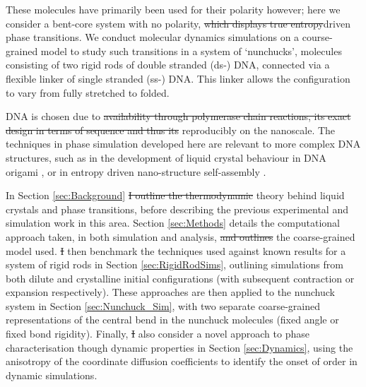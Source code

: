 \documentclass[11pt, a4paper]{article} %
\providecommand{\DIFadd}[1]{{\protect\color{blue}\uwave{#1}}} %
\providecommand{\DIFdel}[1]{{\protect\color{red}\sout{#1}}}                      %
\providecommand{\DIFaddbegin}{} %
\providecommand{\DIFaddend}{} %
\providecommand{\DIFdelbegin}{} %
\providecommand{\DIFdelend}{} %
\begin{document}
These molecules have primarily been used for their polarity however; here we consider a bent-core system with no polarity, \DIFdelbegin \DIFdel{which displays true entropy\textendash }\DIFdelend \DIFaddbegin \DIFadd{\textcolor{forestgreen}{which displays true} entropically }\DIFaddend driven phase transitions. We conduct molecular dynamics simulations on a course-grained model to study such transitions in a system of ‘nunchucks’, molecules consisting of two rigid rods of double stranded (ds-) DNA, connected via a flexible linker of single stranded (ss-) DNA. This linker allows the configuration to vary from fully stretched to folded. 

DNA is chosen due to \DIFdelbegin \DIFdel{availability through polymerase chain reactions, its exact design in terms of sequence and thus its }\DIFdelend \DIFaddbegin \DIFadd{its \textcolor{forestgreen}{availablity through PCR, its exact design in terms of sequence and thus its} }\DIFaddend reproducibly on the nanoscale. The techniques in phase simulation developed here are relevant to more complex DNA structures, such as in the development of liquid crystal behaviour in DNA origami \cite{Cha2015,Wang2018}, or in entropy driven nano-structure self-assembly \cite{Barry2010, Lin2000}.

In Section \ref{sec:Background} \DIFdelbegin \DIFdel{I outline the thermodynamic }\DIFdelend \DIFaddbegin \DIFadd{\textcolor{forestgreen}{I} outline the \textcolor{forestgreen}{thermodynamic} }\DIFaddend theory behind liquid crystals and phase transitions, before describing the previous experimental and simulation work in this area. Section \ref{sec:Methods} details the computational approach taken, in both simulation and analysis, \DIFdelbegin \DIFdel{and outlines }\DIFdelend \DIFaddbegin \DIFadd{\textcolor{forestgreen}{and outlines} }\DIFaddend the coarse-grained model used. \DIFdelbegin \DIFdel{I }\DIFdelend \DIFaddbegin \DIFadd{We }\DIFaddend then benchmark the techniques used against known results for a system of rigid rods in Section \ref{sec:RigidRodSims}, outlining simulations from both dilute and crystalline initial configurations (with subsequent contraction or expansion respectively). These approaches are then applied to the nunchuck system in Section \ref{sec:Nunchuck_Sim}, with two separate coarse-grained representations of the central bend in the nunchuck molecules (fixed angle or fixed bond rigidity). Finally, \DIFdelbegin \DIFdel{I }\DIFdelend \DIFaddbegin \DIFadd{we }\DIFaddend also consider a novel approach to phase characterisation though dynamic properties in Section \ref{sec:Dynamics}, using the anisotropy of the coordinate diffusion coefficients to identify the onset of order in dynamic simulations.
\end{document}
